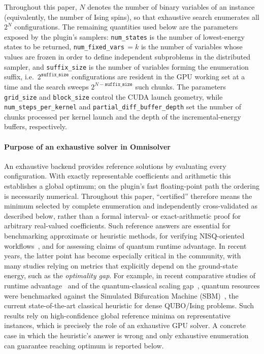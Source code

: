 \documentclass[12pt,a4paper]{elsarticle}
\begin{document}
Throughout this paper, $N$ denotes the number of binary variables of an instance
(equivalently, the number of Ising spins), so that exhaustive search enumerates
all $2^{N}$ configurations. The remaining quantities used below are the
parameters exposed by the plugin's samplers: \texttt{num\_states} is the number
of lowest-energy states to be returned, \texttt{num\_fixed\_vars}\,$=k$ is the
number of variables whose values are frozen in order to define independent
subproblems in the distributed sampler, and \texttt{suffix\_size} is the number
of variables forming the enumeration suffix, i.e.\ $2^{\texttt{suffix\_size}}$
configurations are resident in the GPU working set at a time and the search
sweeps $2^{N-\texttt{suffix\_size}}$ such chunks. The parameters
\texttt{grid\_size} and \texttt{block\_size} control the CUDA launch geometry,
while \texttt{num\_steps\_per\_kernel} and \texttt{partial\_diff\_buffer\_depth}
set the number of chunks processed per kernel launch and the depth of the
incremental-energy buffers, respectively.

\paragraph{Purpose of an exhaustive solver in Omnisolver}
An exhaustive backend provides reference solutions by evaluating every configuration. With
exactly representable coefficients and arithmetic this establishes a global optimum; on the
plugin's fast floating-point path the ordering is necessarily numerical. Throughout this paper,
``certified'' therefore means the minimum selected by complete enumeration and independently
cross-validated as described below, rather than a formal interval- or exact-arithmetic proof for
arbitrary real-valued coefficients. Such reference answers are essential for
benchmarking approximate or heuristic methods, for verifying NISQ-oriented
workflows~\cite{preskill2018quantum}, and for assessing claims of quantum
runtime advantage. In recent years, the latter point has become especially
critical in the community, with many studies relying on metrics that
explicitly depend on the ground-state energy, such as the \emph{optimality gap}.
For example, in recent comparative studies of runtime
advantage~\cite{tuziemski2026limits} and of the quantum-classical scaling
gap~\cite{pawlowski2025closing}, quantum resources were benchmarked against the
Simulated Bifurcation Machine
(SBM)~\cite{goto2016bifurcation,goto2019combinatorial,goto2021high,pawlowski2026sbqa},
the current state-of-the-art classical heuristic for dense QUBO/Ising problems.
Such results rely on high-confidence global reference minima on representative
instances, which is precisely the role of an exhaustive GPU solver. A concrete
case in which the heuristic's answer is wrong and only exhaustive enumeration 
can guarantee reaching optimum is reported below.
\end{document}
